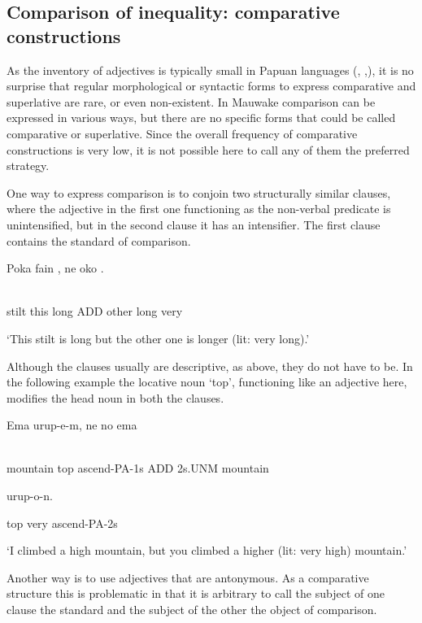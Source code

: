 \subsection{Comparison of inequality: comparative constructions}
\hypertarget{RefHeading22641935131865}{}
As the inventory of adjectives is typically small in Papuan languages (\citealt[268]{Haiman1980}, \citealt[63]{Reesink 1987},\citealt[105-107]{MacDonald1990}), it is no surprise that regular morphological or syntactic forms to express comparative and superlative are rare, or even non-existent. In Mauwake comparison can be expressed in various ways, but there are no specific forms that could be called comparative or superlative. Since the overall frequency of comparative constructions is very low, it is not possible here to call any of them the preferred strategy.

One way to express comparison is to conjoin two structurally similar clauses, where the adjective in the first one functioning as the non-verbal predicate is unintensified, but in the second clause it has an intensifier. The first clause contains the standard of comparison. 

\ea%
\label{ex:x1336}
\gll Poka  fain  ,  ne  oko  . \\
      \\
\glt
\z

stilt  this  long  ADD  other  long  very

`This stilt is long but the other one is longer (lit: very long).'

Although the clauses usually are descriptive, as above, they do not have to be. In the following example the locative noun  `top', functioning like an adjective here, modifies the head noun in both the clauses.  

\ea%
\label{ex:x1324}
\gll Ema   urup-e-m,  ne  no  ema  \\
      \\
\glt
\z

mountain  top  ascend-PA-1s  ADD  2s.UNM  mountain

  urup-o-n.

top  very  ascend-PA-2s

`I climbed a high mountain, but you climbed a higher (lit: very high) mountain.'

Another way is to use adjectives that are antonymous. As a comparative structure this is problematic in that it is arbitrary to call the subject of one clause the standard and the subject of the other the object of comparison. 

